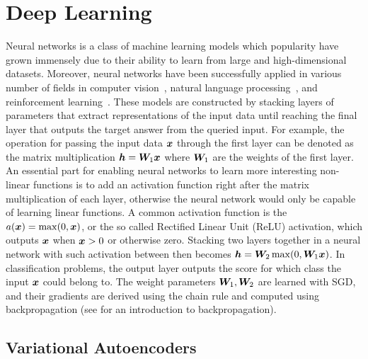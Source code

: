 \section{Deep Learning} 
\label{sec:deep_learning}

Neural networks is a class of machine learning models which popularity have grown immensely due to their ability to learn from large and high-dimensional datasets. Moreover, neural networks have been successfully applied in various number of fields in computer vision~\cite{he2016deep, krizhevsky2012imagenet}, natural language processing~\cite{devlin2018bert}, and reinforcement learning~\cite{mnih2015human, silver2016mastering}. These models are constructed by stacking layers of parameters that extract representations of the input data until reaching the final layer that outputs the target answer from the queried input. For example, the operation for passing the input data ${\bm{x}}$ through the first layer can be denoted as the matrix multiplication ${\bm{h}} = {\bm{W}}_1{\bm{x}}$ where ${\bm{W}}_1$ are the weights of the first layer. An essential part for enabling neural networks to learn more interesting non-linear functions is to add an activation function right after the matrix multiplication of each layer, otherwise the neural network would only be capable of learning linear functions. A common activation function is the $a({\bm{x}}) = \max(0, {\bm{x}})$, or the so called Rectified Linear Unit (ReLU) activation, which outputs ${\bm{x}}$ when ${\bm{x}} > 0$ or otherwise zero. Stacking two layers together in a neural network with such activation between then becomes ${\bm{h}} = {\bm{W}}_2\max(0,  {\bm{W}}_1{\bm{x}})$. In classification problems, the output layer outputs the score for which class the input ${\bm{x}}$ could belong to. The weight parameters ${\bm{W}}_1, {\bm{W}}_2$ are learned with SGD, and their gradients are derived using the chain rule and computed using backpropagation (see \cite{goodfellow2016deep} for an introduction to backpropagation).  


\subsection{Variational Autoencoders}
\label{sec:variational_autoencoders}

